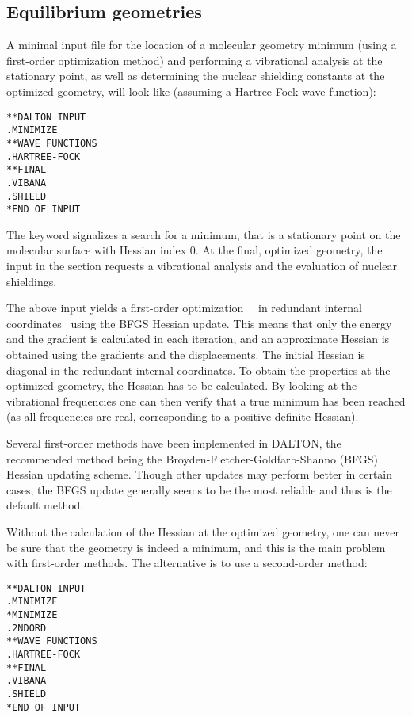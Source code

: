 \subsection{Equilibrium geometries\label{subsec:eqgeo}}

\cite{MEST} \cite{Fletcher} \cite{Peng}
A minimal input file for the location of a molecular geometry minimum
(using a first-order optimization method) and performing a vibrational
analysis at the stationary point, as well as determining the nuclear
shielding constants at the optimized geometry, will look like
(assuming a Hartree-Fock wave function):

\begin{verbatim}
**DALTON INPUT
.MINIMIZE
**WAVE FUNCTIONS
.HARTREE-FOCK
**FINAL
.VIBANA
.SHIELD
*END OF INPUT
\end{verbatim}

The keyword  signalizes a search for a minimum, that is a stationary
point on the molecular surface with Hessian index 0. At the final,
optimized geometry, the input in the  section requests
a vibrational analysis and the evaluation of nuclear shieldings.

The above input yields a first-order
optimization~\cite{MEST}~\cite{Fletcher} in redundant internal
coordinates~\cite{Peng} using the BFGS Hessian update. This means that
only the energy and the gradient is calculated in each iteration, and
an approximate Hessian is obtained using the gradients and the
displacements. The initial Hessian is diagonal in the redundant
internal coordinates. To obtain the properties at the optimized
geometry, the Hessian has to be calculated. By looking at the
vibrational frequencies one can then verify that a true minimum has
been reached (as all frequencies are real, corresponding to a positive
definite Hessian).

Several first-order methods have been implemented in DALTON, the
recommended method being the Broyden-Fletcher-Goldfarb-Shanno (BFGS)
Hessian updating scheme. Though other updates may perform better in
certain cases, the BFGS update generally seems to be the most
reliable and thus is the default method.

Without the calculation of the Hessian at the optimized geometry, one
can never be sure that the geometry is indeed a minimum, and this is the
main problem with first-order methods. The alternative is to
use a second-order method:

\begin{verbatim}
**DALTON INPUT
.MINIMIZE
*MINIMIZE
.2NDORD
**WAVE FUNCTIONS
.HARTREE-FOCK
**FINAL
.VIBANA
.SHIELD
*END OF INPUT
\end{verbatim}

